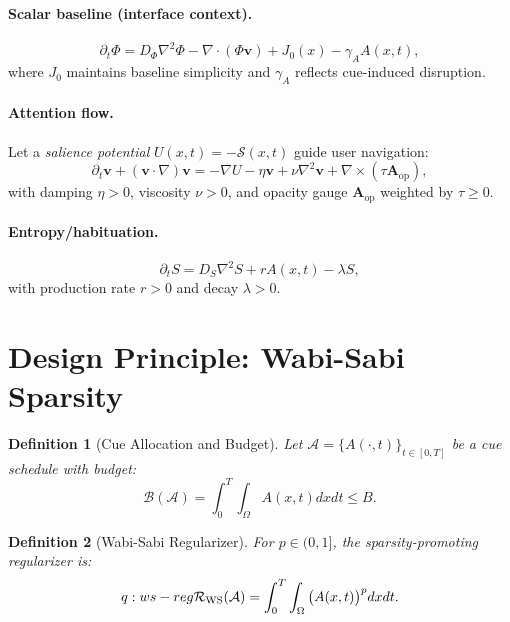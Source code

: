 \documentclass[openany]{book}
\newtheorem{definition}{Definition}[chapter]
\newcommand{\PhiS}{\Phi} %
\newcommand{\vvec}{\mathbf{v}} %
\newcommand{\Sent}{S} %
\begin{document}
\paragraph{Scalar baseline (interface context).}
\begin{equation}
\label{eq:phi}
\partial_t \PhiS = D_\Phi \nabla^2 \PhiS - \nabla \cdot (\PhiS \vvec) + J_0(x) - \gamma_A A(x,t),
\end{equation}
where $J_0$ maintains baseline simplicity and $\gamma_A$ reflects cue-induced disruption.
\paragraph{Attention flow.}
Let a \emph{salience potential} $U(x,t) = -\mathcal{S}(x,t)$ guide user navigation:
\begin{equation}
\label{eq:v}
\partial_t \vvec + (\vvec \cdot \nabla)\vvec = -\nabla U - \eta \vvec + \nu \nabla^2 \vvec + \nabla \times (\tau \mathbf{A}_{\mathrm{op}}),
\end{equation}
with damping $\eta > 0$, viscosity $\nu > 0$, and opacity gauge $\mathbf{A}_{\mathrm{op}}$ weighted by $\tau \geq 0$.
\paragraph{Entropy/habituation.}
\begin{equation}
\label{eq:S}
\partial_t \Sent = D_S \nabla^2 \Sent + r A(x,t) - \lambda \Sent,
\end{equation}
with production rate $r > 0$ and decay $\lambda > 0$.

\section{Design Principle: Wabi-Sabi Sparsity}
\label{sec:rsvp-wabisabi}
\begin{definition}[Cue Allocation and Budget]
\label{def:budget}
Let $\mathcal{A} = \{A(\cdot,t)\}_{t \in [0,T]}$ be a cue schedule with budget:
\begin{equation}
\label{eq:budget}
\mathcal{B}(\mathcal{A}) = \int_{0}^{T} \int_{\Omega} A(x,t) dx dt \leq B.
\end{equation}
\end{definition}

\begin{definition}[Wabi-Sabi Regularizer]
\label{def:ws}
For $p \in (0,1]$, the sparsity-promoting regularizer is:
\begin{equation}
\label eq:ws-reg
\mathcal{R}_{\mathrm{WS}}(\mathcal{A}) = \int_{0}^{T} \int_{\Omega} \big(A(x,t)\big)^p dx dt.
\end{equation}
\end{definition}
\end{document}
